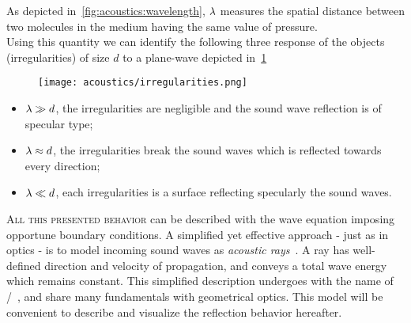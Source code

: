 As depicted in~\cref{fig:acoustics:wavelength}, $\lambda$ measures the spatial distance between two molecules in the medium having the same value of pressure.
\\Using this quantity we can identify the following three response of the objects (irregularities) of size $d$ to a plane-wave depicted in~\cref{fig:acoustics:irregularities}
\begin{figure}
    \footnotesize
    \texttt{[image: acoustics/irregularities.png]}
    \label{fig:acoustics:irregularities}
\end{figure}
\begin{itemize}
    \item $\lambda \gg d$, the irregularities are negligible and the sound wave reflection is of specular type;
    \item $\lambda \approx d$, the irregularities break the sound waves which is reflected towards every direction;
    \item $\lambda \ll d$, each irregularities is a surface reflecting specularly the sound waves.
\end{itemize}

\textsc{All this presented behavior} can be described with the wave equation imposing opportune boundary conditions.
A simplified yet effective approach - just as in optics - is to model incoming sound waves as \textit{acoustic rays}~.
A ray has well-defined direction and velocity of propagation, and conveys a total wave energy which remains constant.
This simplified description undergoes with the name of \GAdef/~\cite{savioja2015overview}, and share many fundamentals with geometrical optics.
This model will be convenient to describe and visualize the reflection behavior hereafter.

